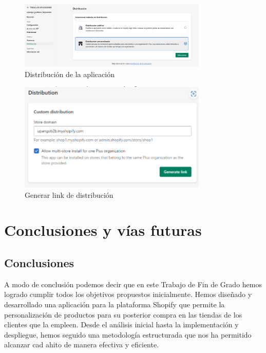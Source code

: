 \documentclass[12pt]{article}
\begin{document}
\begin{figure}[ht]
    \centering
    \includegraphics[width=0.8\textwidth]{imagenes/distribucionAppEnlace.png}
    \caption{\label{fig:DistributionAppPartners}Distribución de la aplicación}
    \vspace{\fill}
\end{figure}

\begin{figure}[ht]
    \centering
    \includegraphics[width=0.8\textwidth]{imagenes/generarLinkDistribution.png}
    \caption{\label{fig:generarLinkDistribution}Generar link de distribución}
    \vspace{\fill}
\end{figure}

\newpage
\section{Conclusiones y vías futuras}

\subsection{Conclusiones}
A modo de conclusión podemos decir que en este Trabajo de Fin de Grado hemos logrado cumplir todos
los objetivos propuestos inicialmente. Hemos diseñado y desarrollado una aplicación para la plataforma Shopify que 
permite la personalización de productos para su posterior compra en las tiendas de los clientes que la empleen.
Desde el análisis inicial hasta la implementación y despliegue, hemos seguido una metodología estructurada que nos ha permitido
alcanzar cad ahito de manera efectiva y eficiente.
\end{document}

